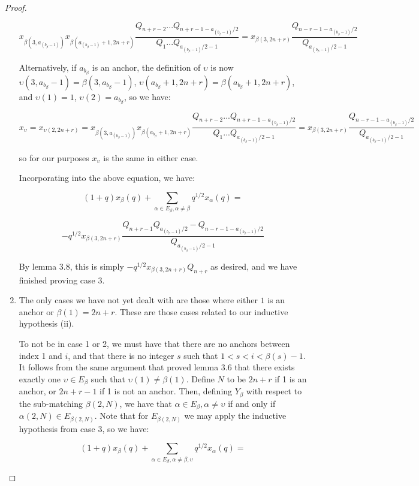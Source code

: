 \documentclass{amsart}
\begin{document}
\begin{proof}
\begin{enumerate}
	$$x_{\beta(3,a_{(b_\beta-1)})}x_{\beta(a_{(b_\beta-1)}+1,2n+r)}\frac{Q_{n+r-2}...Q_{n+r-1-a_{(b_\beta-1)}/2}}{Q_1...Q_{a_{(b_\beta-1)}/2-1}}=x_{\beta(3,2n+r)}\frac{Q_{n-r-1-a_{(b_\beta-1)}/2}}{Q_{a_{(b_\beta-1)}/2-1}}$$
	
	Alternatively, if $a_{b_\beta}$ is an anchor, the definition of $\upsilon$ is now $\upsilon(3,a_{b_\beta}-1)=\beta(3,a_{b_\beta}-1)$, $\upsilon(a_{b_\beta}+1,2n+r)=\beta(a_{b_\beta}+1,2n+r)$, and $\upsilon(1)=1$, $\upsilon(2)=a_{b_\beta}$, so we have:
	
	$$x_\upsilon=x_{\upsilon(2,2n+r)}=x_{\beta(3,a_{(b_\beta-1)})}x_{\beta(a_{b_\beta}+1,2n+r)}\frac{Q_{n+r-2}...Q_{n+r-1-a_{(b_\beta-1)}/2}}{Q_1...Q_{a_{(b_\beta-1)}/2-1}}=x_{\beta(3,2n+r)}\frac{Q_{n-r-1-a_{(b_\beta-1)}/2}}{Q_{a_{(b_\beta-1)}/2-1}}$$
	
	so for our purposes $x_\upsilon$ is the same in either case.
	
	Incorporating into the above equation, we have:
	
	$$(1+q)x_\beta(q)+\sum_{\alpha\in E_\beta,\alpha\not=\beta}q^{1/2}x_\alpha(q)=$$
	
	
	$$-q^{1/2}x_{\beta(3,2n+r)}\frac{Q_{n+r-1}Q_{a_{(b_\beta-1)}/2}-Q_{n-r-1-a_{(b_\beta-1)}/2}}{Q_{a_{(b_\beta-1)}/2-1}}$$	
	
	By lemma 3.8, this is simply $-q^{1/2}x_{\beta(3,2n+r)}Q_{n+r}$ as desired, and we have finished proving case 3.
	\\
	
	\item The only cases we have not yet dealt with are those where either $1$ is an anchor or $\beta(1)=2n+r$. These are those cases related to our inductive hypothesis (ii).
	
	To not be in case 1 or 2, we must have that there are no anchors between index 1 and $i$, and that there is no integer $s$ such that $1<s<i<\beta(s)-1$. It follows from the same argument that proved lemma 3.6 that there exists exactly one $\upsilon\in E_\beta$ such that $\upsilon(1)\not=\beta(1)$. Define $N$ to be $2n+r$ if 1 is an anchor, or $2n+r-1$ if 1 is not an anchor. Then, defining $Y_\beta$ with respect to the sub-matching $\beta(2,N)$, we have that $\alpha\in E_\beta, \alpha\not=\upsilon$ if and only if $\alpha(2,N)\in E_{\beta(2,N)}$. Note that for $E_{\beta(2,N)}$ we may apply the inductive hypothesis from case 3, so we have:
	
	$$(1+q)x_\beta(q)+\sum_{\alpha\in E_\beta,\alpha\not=\beta,\upsilon}q^{1/2}x_\alpha(q)=$$
	

\end{enumerate}
\end{proof}
\end{document}
